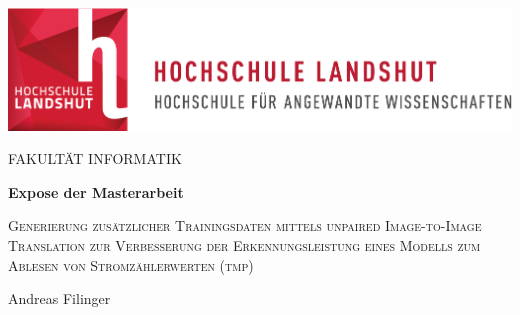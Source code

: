 \thispagestyle{empty}
\begin{titlepage}
	\vspace{3cm}



\begin{center}
	\includegraphics[scale=0.8]{Titelseite/hl-logo.pdf}  
\end{center}

\vspace{2.5cm}

\begin{center}
  \Large FAKULTÄT INFORMATIK
\end{center}

\vspace{1cm}
\begin{center}
	\Huge
	\textbf{Expose der Masterarbeit}\\
\end{center}

\vspace{1cm}

\begin{center}
	\Large
	\textsc{Generierung zusätzlicher Trainingsdaten mittels unpaired Image-to-Image Translation zur Verbesserung der Erkennungsleistung eines Modells zum Ablesen von Stromzählerwerten (tmp)}\\
\end{center}

\vspace{1.5cm}

\begin{center}
	\Large
	Andreas Filinger
\end{center}

\vspace{2cm}	%
\begin{center}
	\large
\end{center}

\end{titlepage}
